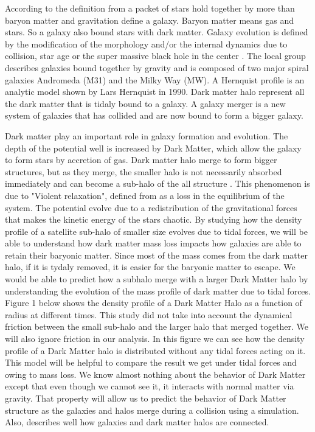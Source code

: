 \documentclass{aastex63}
\begin{document}
According to the definition from \cite{Will12} a packet of stars hold together by more than baryon matter and gravitation define a galaxy. Baryon matter means gas and stars. So a galaxy also bound stars with dark matter. Galaxy evolution is defined by the modification of the morphology and/or the internal dynamics due to collision, star age or the super massive black hole in the center  \citep{Will12}. The local group describes galaxies bound together by gravity and is composed of two major spiral galaxies Andromeda (M31) and the Milky Way (MW). A Hernquist profile is an analytic model shown by Lars Hernquist in 1990\citep{Hern90}. Dark matter halo represent all the dark matter that is tidaly bound to a galaxy. A galaxy merger is a new system of galaxies that has collided and are now bound to form a bigger galaxy.
\vspace{1.5mm}

Dark matter play an important role in galaxy formation and evolution. The depth of the potential well is increased by Dark Matter, which allow the galaxy to form stars by accretion of gas. Dark matter halo merge to form bigger structures, but as they merge, the smaller halo is not necessarily absorbed immediately and can become a sub-halo of the all structure \citep{Delos19}. This phenomenon is due to "Violent relaxation", defined from \cite{Bell67} as a loss in the equilibrium of the system. The potential evolve due to a redistribution of the gravitational forces that makes the kinetic energy of the stars chaotic.
By studying how the density profile of a satellite sub-halo of smaller size evolves due to tidal forces, we will be able to understand how dark matter mass loss impacts how galaxies are able to retain their baryonic matter. Since most of the mass comes from the dark matter halo, if it is tydaly removed, it is easier for the baryonic matter to escape.
We would be able to predict how a subhalo merge with a larger Dark Matter halo by understanding the evolution of the mass profile of dark matter due to tidal forces.
Figure 1 below shows the density profile of a Dark Matter Halo as a function of radius at different times. This study did not take into account the dynamical friction between  the small sub-halo and the larger halo that merged together. We will also ignore friction in our analysis. In this figure we can see how the density profile of a Dark Matter halo is distributed without any tidal forces acting on it. This model will be helpful to compare the result we get under tidal forces and owing to mass loss.
We know almost nothing about the behavior of Dark Matter except that even though we cannot see it, it interacts with normal matter via gravity. That property will allow us to predict the behavior of Dark Matter structure as the galaxies and halos merge during a collision using a simulation. Also, \cite{Wechsler18} describes well how galaxies and dark matter halos are connected. 
\end{document}
